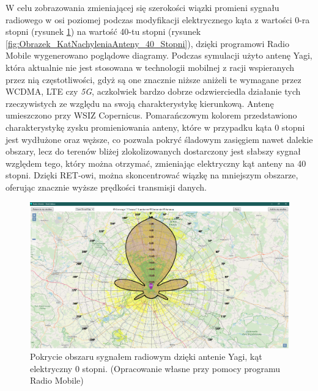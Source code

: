 		W celu zobrazowania zmieniającej się szerokości wiązki promieni sygnału radiowego w osi poziomej\cite{BEAMWIDTH_1}
		podczas modyfikacji elektrycznego kąta z wartości 0-ra stopni (rysunek \ref{fig:Obrazek_KatNachyleniaAnteny_0_Stopni})
		na wartość 40-tu stopni (rysunek \ref{fig:Obrazek_KatNachyleniaAnteny_40_Stopni}), dzięki programowi Radio Mobile\cite{RADIO_MOBILE_PAGE_1} wygenerowano poglądowe diagramy.
		Podczas symulacji użyto antenę Yagi, która aktualnie nie jest stosowana w technologii mobilnej z racji wspieranych
		przez nią częstotliwości, gdyż są one znacznie niższe aniżeli te wymagane przez WCDMA, LTE czy \textit{5G}, 
		aczkolwiek bardzo dobrze odzwierciedla działanie tych rzeczywistych ze względu na swoją charakterystykę kierunkową.
		\newline
		Antenę umieszczono przy WSIZ Copernicus. \newline
		Pomarańczowym kolorem przedstawiono charakterystykę zysku promieniowania anteny, które w przypadku kąta 0 stopni jest wydłużone oraz węższe,
		co pozwala pokryć śladowym zasięgiem nawet dalekie obszary, lecz do terenów bliżej zlokolizowanych dostarczony
		jest słabszy sygnał względem tego, który można otrzymać, zmieniając elektryczny kąt anteny na 40 stopni.
		Dzięki RET-owi, można skoncentrować wiązkę na mniejszym obszarze, oferując znacznie wyższe prędkości transmisji danych.

		\begin{figure}[h!]
			\centering
			\includegraphics[scale=0.5]{Obrazki/Antenna_Yagi_Angle_0.png}
			\caption{Pokrycie obszaru sygnałem radiowym dzięki antenie Yagi, kąt elektryczny 0 stopni.
				\newline(Opracowanie własne przy pomocy programu Radio Mobile)}
			\label{fig:Obrazek_KatNachyleniaAnteny_0_Stopni}
		\end{figure}

